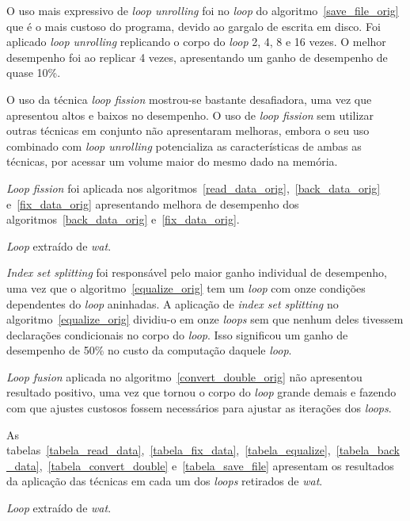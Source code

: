 \documentclass[12pt]{article}
\begin{document}
O uso mais expressivo de \textit{loop unrolling} foi no \textit{loop} do
algoritmo~\ref{save_file_orig} que é o mais
custoso do programa, devido ao gargalo de escrita em disco.
Foi aplicado \textit{loop unrolling} replicando o corpo do \textit{loop} 2, 4, 8
e 16 vezes. O melhor desempenho foi ao replicar 4 vezes, apresentando um ganho
de desempenho de quase 10\%.

O uso da técnica \textit{loop fission} mostrou-se bastante desafiadora, uma vez
que apresentou altos e baixos no desempenho.
O uso de \textit{loop fission} sem utilizar outras técnicas em conjunto não
apresentaram melhoras, embora o seu uso combinado com \textit{loop unrolling}
potencializa as características de ambas as técnicas, por acessar um volume
maior do mesmo dado na memória.

\textit{Loop fission} foi aplicada nos
algoritmos~\ref{read_data_orig},~\ref{back_data_orig} e~\ref{fix_data_orig}
apresentando melhora de desempenho dos algoritmos~\ref{back_data_orig}
e~\ref{fix_data_orig}.

\begin{algorithm}[H]
  \caption{\textit{Loop} extraído de \textit{wat}.}
    \label{back_data_orig}

\end{algorithm}


\textit{Index set splitting} foi responsável pelo maior ganho individual de
desempenho, uma vez que o algoritmo~\ref{equalize_orig} tem um \textit{loop} 
com onze condições dependentes do \textit{loop} aninhadas. 
A aplicação de \textit{index set splitting} no algoritmo~\ref{equalize_orig} 
dividiu-o em onze \textit{loops} sem que nenhum deles tivessem declarações 
condicionais no corpo do \textit{loop}. 
Isso significou um ganho de desempenho de 50\% no custo da computação daquele
\textit{loop}.

\textit{Loop fusion} aplicada no algoritmo~\ref{convert_double_orig} não
apresentou resultado positivo, uma vez que tornou o corpo do \textit{loop}
grande demais e fazendo com que ajustes custosos fossem necessários para ajustar
as iterações dos \textit{loops}.

As
tabelas~\ref{tabela_read_data},~\ref{tabela_fix_data},~\ref{tabela_equalize},~\ref{tabela_back_data},~\ref{tabela_convert_double}
e~\ref{tabela_save_file} apresentam os resultados da aplicação das técnicas em
cada um dos \textit{loops} retirados de \textit{wat}.

\begin{algorithm}[H]
  \caption{\textit{Loop} extraído de \textit{wat}.}
    \label{equalize_orig}

\end{algorithm}
\end{document}
